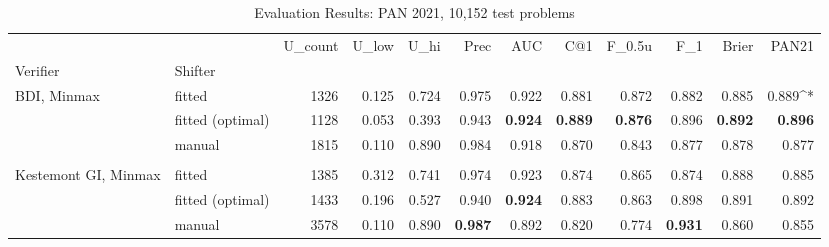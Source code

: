 \documentclass[
    hf
]{ceurart}
\begin{document}
\begin{table}
    \caption{Evaluation Results: PAN 2021, 10,152 test problems}
    \label{tab:p20eval}
    \raggedright
    \begin{adjustbox}{max width=\textwidth}
        \begin{tabular}{llrrrrrrrrrr}
            \toprule
                                                      &                  & U_{count} & U_{low} & U_{hi} & Prec           & AUC            & C@1            & F_{0.5u}        & F_1            & Brier          & PAN21        \\
            Verifier                                  & Shifter          &           &         &        &                &                &                &                &                &                &                \\
            \midrule
            \multirow[c]{3}{*}{BDI, Minmax }          & fitted           & 1326      & 0.125   & 0.724  & 0.975          & 0.922          & 0.881          & 0.872          & 0.882          & 0.885          & 0.889^{*}      \\
                                                      & fitted (optimal) & 1128      & 0.053   & 0.393  & 0.943          & \textbf{0.924} & \textbf{0.889} & \textbf{0.876} & 0.896          & \textbf{0.892} & \textbf{0.896} \\
                                                      & manual           & 1815      & 0.110   & 0.890  & 0.984          & 0.918          & 0.870          & 0.843          & 0.877          & 0.878          & 0.877          \\
            \\
            \multirow[c]{3}{*}{Kestemont GI, Minmax } & fitted           & 1385      & 0.312   & 0.741  & 0.974          & 0.923          & 0.874          & 0.865          & 0.874          & 0.888          & 0.885          \\
                                                      & fitted (optimal) & 1433      & 0.196   & 0.527  & 0.940          & \textbf{0.924} & 0.883          & 0.863          & 0.898          & 0.891          & 0.892          \\
                                                      & manual           & 3578      & 0.110   & 0.890  & \textbf{0.987} & 0.892          & 0.820          & 0.774          & \textbf{0.931} & 0.860          & 0.855          \\


\end{tabular}
\end{adjustbox}
\end{table}
\end{document}
